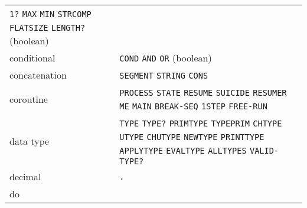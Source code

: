 \documentclass[a4paper,]{article}
\begin{document}
\begin{longtable}[]{@{}ll@{}}
\begin{minipage}[t]{0.83\columnwidth}
\texttt{1?} \texttt{MAX} \texttt{MIN} \texttt{STRCOMP} \texttt{FLATSIZE} \texttt{LENGTH?} (boolean)\strut
\end{minipage}\tabularnewline
\begin{minipage}[t]{0.11\columnwidth}\raggedright\strut
conditional\strut
\end{minipage} & \begin{minipage}[t]{0.83\columnwidth}\raggedright\strut
\texttt{COND} \texttt{AND} \texttt{OR} (boolean)\strut
\end{minipage}\tabularnewline
\begin{minipage}[t]{0.11\columnwidth}\raggedright\strut
concatenation\strut
\end{minipage} & \begin{minipage}[t]{0.83\columnwidth}\raggedright\strut
\texttt{SEGMENT} \texttt{STRING} \texttt{CONS}\strut
\end{minipage}\tabularnewline
\begin{minipage}[t]{0.11\columnwidth}\raggedright\strut
coroutine\strut
\end{minipage} & \begin{minipage}[t]{0.83\columnwidth}\raggedright\strut
\texttt{PROCESS} \texttt{STATE} \texttt{RESUME} \texttt{SUICIDE} \texttt{RESUMER} \texttt{ME} \texttt{MAIN}
\texttt{BREAK-SEQ} \texttt{1STEP} \texttt{FREE-RUN}\strut
\end{minipage}\tabularnewline
\begin{minipage}[t]{0.11\columnwidth}\raggedright\strut
data type\strut
\end{minipage} & \begin{minipage}[t]{0.83\columnwidth}\raggedright\strut
\texttt{TYPE} \texttt{TYPE?} \texttt{PRIMTYPE} \texttt{TYPEPRIM} \texttt{CHTYPE} \texttt{UTYPE} \texttt{CHUTYPE}
\texttt{NEWTYPE} \texttt{PRINTTYPE} \texttt{APPLYTYPE} \texttt{EVALTYPE} \texttt{ALLTYPES} \texttt{VALID-TYPE?}\strut
\end{minipage}\tabularnewline
\begin{minipage}[t]{0.11\columnwidth}\raggedright\strut
decimal\strut
\end{minipage} & \begin{minipage}[t]{0.83\columnwidth}\raggedright\strut
\texttt{.}\strut
\end{minipage}\tabularnewline
\begin{minipage}[t]{0.11\columnwidth}\raggedright\strut
do\strut
\end{minipage} & \begin{minipage}[t]{0.83\columnwidth}\raggedright\strut

\end{minipage}
\end{longtable}
\end{document}
